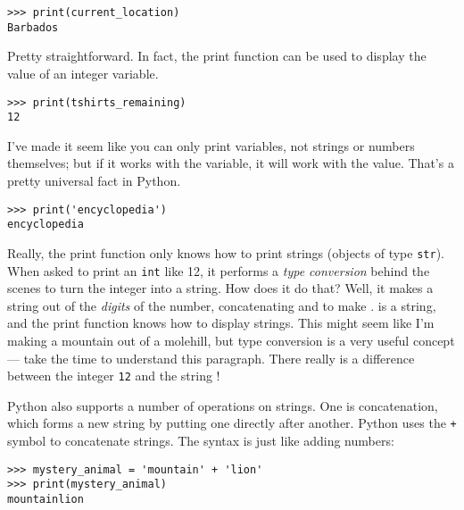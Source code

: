 \begin{lstlisting}[numbers=none]
>>> print(current_location)
Barbados
\end{lstlisting}

Pretty straightforward. In fact, the print function can be used to display the value of an integer variable.

\begin{lstlisting}[numbers=none]
>>> print(tshirts_remaining)
12
\end{lstlisting}

I’ve made it seem like you can only print variables, not strings or numbers themselves; but if it works with the variable, it will work with the value. That’s a pretty universal fact in Python.

\begin{lstlisting}[numbers=none]
>>> print('encyclopedia')
encyclopedia
\end{lstlisting}

Really, the print function only knows how to print strings (objects of type \texttt{\textquotesingle str\textquotesingle}). When asked to print an \texttt{\textquotesingle int\textquotesingle} like 12, it performs a \emph{type conversion} behind the scenes to turn the integer into a string. How does it do that? Well, it makes a string out of the \emph{digits} of the number, concatenating \texttt{\textquotesingle} and \texttt{\textquotesingle} to make \texttt{\textquotesingle}. \texttt{\textquotesingle} is a string, and the print function knows how to display strings. This might seem like I’m making a mountain out of a molehill, but type conversion is a very useful concept --- take the time to understand this paragraph. There really is a difference between the integer \texttt{12} and the string \texttt{\textquotesingle}!


Python also supports a number of operations on strings. One is concatenation, which forms a new string by putting one directly after another. Python uses the \texttt{+} symbol to concatenate strings. The syntax is just like adding numbers:

\begin{lstlisting}[numbers=none]
>>> mystery_animal = 'mountain' + 'lion'
>>> print(mystery_animal)
mountainlion
\end{lstlisting}

